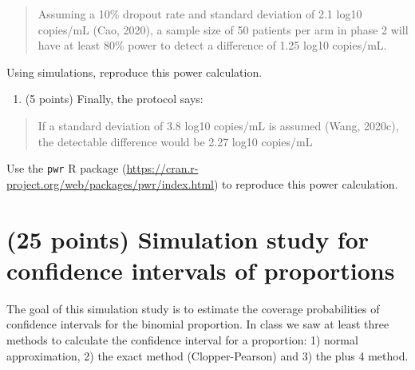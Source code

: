 \documentclass[letterpaper,12pt,twoside,]{pinp}
\providecommand{\tightlist}{%
  \setlength{\itemsep}{0pt}\setlength{\parskip}{0pt}}
\begin{document}
\begin{quote}
Assuming a 10\% dropout rate and standard deviation of 2.1 log10
copies/mL (Cao, 2020), a sample size of 50 patients per arm in phase 2
will have at least 80\% power to detect a difference of 1.25 log10
copies/mL.
\end{quote}

Using simulations, reproduce this power calculation.

\begin{enumerate}
\def\labelenumi{\alph{enumi})}
\setcounter{enumi}{2}
\tightlist
\item
  (5 points) Finally, the protocol says:
\end{enumerate}

\begin{quote}
If a standard deviation of 3.8 log10 copies/mL is assumed (Wang, 2020c),
the detectable difference would be 2.27 log10 copies/mL
\end{quote}

Use the \texttt{pwr} R package
(\url{https://cran.r-project.org/web/packages/pwr/index.html}) to
reproduce this power calculation.

\hypertarget{points-simulation-study-for-confidence-intervals-of-proportions}{%
\section{(25 points) Simulation study for confidence intervals of
proportions}\label{points-simulation-study-for-confidence-intervals-of-proportions}}

The goal of this simulation study is to estimate the coverage
probabilities of confidence intervals for the binomial proportion. In
class we saw at least three methods to calculate the confidence interval
for a proportion: 1) normal approximation, 2) the exact method
(Clopper-Pearson) and 3) the plus 4 method.
\end{document}
